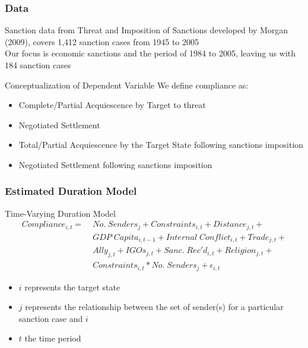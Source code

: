 \documentclass{beamer}
\begin{document}
\begin{frame}
\frametitle{Data}

Sanction data from Threat and Imposition of Sanctions developed by Morgan (2009), covers 1,412 sanction cases from 1945 to 2005 \\
\vspace{0.5cm}
Our focus is economic sanctions and the period of 1984 to 2005, leaving us with 184 sanction cases
\vspace{0.5cm}
\begin{block}{Conceptualization of Dependent Variable}
	We define compliance as:

	\begin{itemize}
		\item Complete/Partial Acquiescence by Target to threat
		\item Negotiated Settlement
		\item Total/Partial Acquiescence by the Target State following sanctions imposition
		\item Negotiated Settlement following sanctions imposition
	\end{itemize}
\end{block}

\end{frame}

\begin{frame}
\frametitle{Estimated Duration Model}

\begin{block}{Time-Varying Duration Model}
	\begin{align*}
		Compliance_{i,t} =\; & No. \; Senders_{j} + Constraints_{i,t} + Distance_{j,t} + \\
		 &GDP \; Capita_{i,t-1} +  Internal \; Conflict_{i,t} + Trade_{j,t} + \\
		 &Ally_{j,t} + IGOs_{j,t} + Sanc. \; Rec'd_{i,t} + Religion_{j,t} + \\
		 &Constraints_{i,t}*No. \; Senders_{j} + \epsilon_{i,t}
	\end{align*}
\end{block}

\begin{itemize}
	\item $i$ represents the target state
	\item $j$ represents the relationship between the set of sender(s) for a particular sanction case and $i$
	\item $t$ the time period
\end{itemize}

\end{frame}
\end{document}
